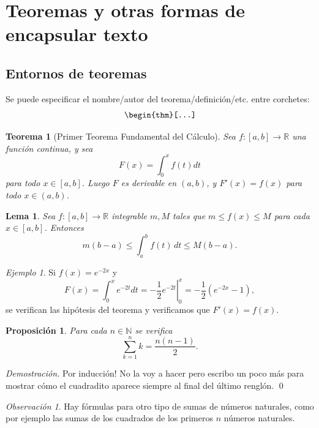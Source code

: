 \documentclass[12pt, spanish]{report}
\theoremstyle{definition} %
\providecommand{\remarkname}{Observación}
\theoremstyle{remark} %
\newtheorem{rem}[defn]{\protect\remarkname}
\providecommand{\theoremname}{Teorema}
\theoremstyle{plain} %
\newtheorem{thm}[defn]{\protect\theoremname}
\theoremstyle{plain} %
\providecommand{\lemmaname}{Lema}
\theoremstyle{plain} %
\newtheorem{lem}[defn]{\protect\lemmaname}
\providecommand{\propositionname}{Proposición}
\theoremstyle{plain} %
\newtheorem{prop}[defn]{\protect\propositionname}
\theoremstyle{plain} %
\providecommand{\examplename}{Ejemplo}
\theoremstyle{remark} %
\newtheorem{example}[defn]{\protect\examplename}
\newenvironment{dem}{\noindent\textit{Demostración.}}{\hfill\qed\par\vspace{10pt}}
\numberwithin{defn}{chapter}
\newcommand{\real}[0]{\mathbb{R}} %
\newcommand{\nat}[0]{\mathbb{N}} %
\begin{document}
\begin{itemize}
\end{itemize}

\section{Teoremas y otras formas de encapsular texto}

\subsection{Entornos de teoremas}

Se puede especificar el nombre/autor del teorema/definición/etc. entre corchetes:
\[
    \verb|\begin{thm}[...]|
\]

\begin{thm}[Primer Teorema Fundamental del Cálculo]
    Sea $f:[a, b]\to\real$ una función continua, y sea
    \[
    F(x) = \int_0^x f(t) dt
    \]
    para todo $x \in [a,b]$. Luego $F$ es derivable en $(a,b)$, y $F'(x) = f(x)$ para todo $x \in (a,b)$.
\end{thm}

\begin{lem}
    Sea $f:[a, b]\to\real$ integrable $m, M$ tales que $m \leq f(x) \leq M$ para cada $x \in [a,b]$. Entonces
    \[
    m(b-a) \leq \int_a^b f(t)\, dt \leq M(b-a).
    \]
    
\end{lem}

\begin{example}
    Si $f(x) = e^{-2x}$ y
    \[
        F(x) = \int_0^x e^{-2t} dt = \left.-\frac{1}{2}e^{-2t}\right|_0^x = -\frac{1}{2}(e^{-2x} - 1),
    \]
    se verifican las hipótesis del teorema y verificamos que $F'(x) = f(x)$.
\end{example}

\begin{prop}
    Para cada $n\in\nat$ se verifica
    \[
        \sum_{k=1}^n k = \frac{n(n-1)}{2}.
    \]
\end{prop}
\begin{dem}
    Por inducción! No la voy a hacer pero escribo un poco más para mostrar cómo el cuadradito aparece siempre al final del último renglón.
\end{dem}

\begin{rem}
    Hay fórmulas para otro tipo de sumas de números naturales, como por ejemplo las sumas de los cuadrados de los primeros $n$ números naturales.
\end{rem}
\end{document}
